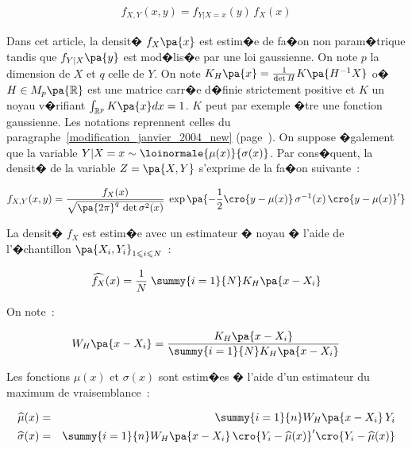         \begin{eqnarray}
        f_{X,Y}(x,y) = f_{Y | X=x}(y) \, f_X(x)
        \end{eqnarray}

Dans cet article, la densit� $f_X\pa{x}$ est estim�e de fa�on non param�trique tandis que $f_{Y|X}\pa{y}$ est mod�lis�e par une loi gaussienne. On note $p$ la dimension de $X$ et $q$ celle de $Y$. On note $K_H \pa{x} = \frac{1}{\det H} K \pa{H^{-1} X}$ o� $H \in M_p\pa{\mathbb{R}}$ est une matrice carr�e d�finie strictement positive et $K$ un noyau v�rifiant $\int_{\mathbb{R}^p} K\pa{x} dx = 1$. $K$ peut par exemple �tre une fonction gaussienne. Les notations reprennent celles du paragraphe~\ref{modification_janvier_2004_new} (page~\pageref{modification_janvier_2004_new}). On suppose �galement que la variable $Y | X=x \sim \loinormale{\mu(x)}{\sigma(x)}$. Par cons�quent, la densit� de la variable $Z =\pa{X,Y}$ s'exprime de la fa�on suivante~:


        \begin{eqnarray}
        f_{X,Y}(x,y) =  \frac{ f_X(x) } { \sqrt{ \pa{2 \pi}^q \, \det \sigma^2(x) } } \;
                                        \exp \pa{ - \frac{1}{2} \cro{y - \mu(x)} \, \sigma^{-1}(x) \, \cro{y - \mu(x)}' }
        \end{eqnarray}


La densit� $f_X$ est estim�e avec un estimateur � noyau � l'aide de l'�chantillon $\pa{X_i,Y_i}_{1 \leqslant i \leqslant N}$~:

        
        \begin{eqnarray}
        \widehat{f_X} (x) = \frac{1}{N} \; \summy{i=1}{N} K_{H} \pa{ x - X_i}
        \end{eqnarray}

On note~:

        \begin{eqnarray}
        W_H\pa{x - X_i} =  \frac{K_H\pa{x - X_i}} {\summy{i=1}{N} K_H\pa{x - X_i} }
        \end{eqnarray}
        
Les fonctions $\mu(x)$ et $\sigma(x)$ sont estim�es � l'aide d'un estimateur du maximum de vraisemblance~:
        
        \begin{eqnarray}
        \widehat{\mu}(x)         &=& \summy{i=1}{n} W_H\pa{x - X_i} \, Y_i \\
        \widehat{\sigma}(x) &=& \summy{i=1}{n} W_H\pa{x - X_i} \, 
                                                        \cro{Y_i - \widehat{\mu}(x)}' \cro{Y_i - \widehat{\mu}(x)} 
        \end{eqnarray}

